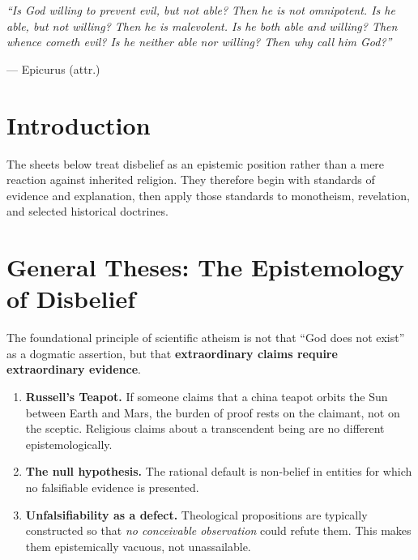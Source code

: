 \documentclass[11pt,twoside]{article}
\begin{document}
\vspace{15mm}

\begin{citazione}
\textit{``Is God willing to prevent evil, but not able? Then he is not
omnipotent.  Is he able, but not willing?  Then he is malevolent.
Is he both able and willing?  Then whence cometh evil?
Is he neither able nor willing?  Then why call him God?''}

\medskip
\hfill--- Epicurus (attr.)
\end{citazione}

\newpage

\tableofcontents
\newpage

\section{Introduction}

The sheets below treat disbelief as an epistemic position rather than a mere
reaction against inherited religion. They therefore begin with standards of
evidence and explanation, then apply those standards to monotheism, revelation,
and selected historical doctrines.

\section{General Theses: The Epistemology of Disbelief}

\begin{scheda}
The foundational principle of scientific atheism is not that ``God does not
exist'' as a dogmatic assertion, but that \textbf{extraordinary claims require
extraordinary evidence}.

\begin{enumerate}
  \item \textbf{Russell's Teapot.}
    If someone claims that a china teapot orbits the Sun between Earth and Mars,
    the burden of proof rests on the claimant, not on the sceptic.  Religious
    claims about a transcendent being are no different epistemologically.
  \item \textbf{The null hypothesis.}
    The rational default is non-belief in entities for which no falsifiable
    evidence is presented.
  \item \textbf{Unfalsifiability as a defect.}
    Theological propositions are typically constructed so that \emph{no
    conceivable observation} could refute them.  This makes them
    epistemically vacuous, not unassailable.
\end{enumerate}
\end{scheda}
\end{document}
